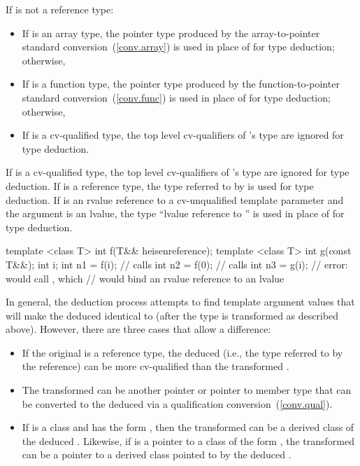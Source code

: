 \exitexample

\pnum
If
is not a reference type:

\begin{itemize}
\item
If
is an array type, the pointer type produced by the array-to-pointer
standard conversion~(\ref{conv.array}) is used in place of
for type deduction;
otherwise,
\item
If
is a function type, the pointer type produced by the
function-to-pointer standard conversion~(\ref{conv.func}) is used in place
of
for type
deduction; otherwise,
\item
If
is a cv-qualified type, the top level cv-qualifiers of
's
type are ignored for type deduction.
\end{itemize}

\pnum
If
is a cv-qualified type, the top level cv-qualifiers of
's
type are ignored for type deduction.
If
is a reference type, the type
referred to by
is used for type deduction.
If  is an rvalue reference to a cv-unqualified template parameter and the argument is an
lvalue, the type ``lvalue reference to '' is used in place of  for type
deduction. \enterexample
\begin{codeblock}
template <class T> int f(T&& heisenreference);
template <class T> int g(const T&&);
int i;
int n1 = f(i);                  // calls 
int n2 = f(0);                  // calls 
int n3 = g(i);                  // error: would call , which
                                // would bind an rvalue reference to an lvalue
\end{codeblock}
\exitexample

\pnum
In general, the deduction process attempts to find template argument
values that will make the deduced
identical to
(after
the type
is transformed as described above).
However, there are
three cases that allow a difference:

\begin{itemize}
\item
If the original
is a reference type, the deduced
(i.e.,
the type referred to by the reference) can be more cv-qualified than
the transformed .
\item
The transformed 
can be another pointer or pointer to member type that can be converted
to the deduced
via a qualification conversion~(\ref{conv.qual}).

\item
If
is a class and
has the form
,
then
the transformed 
can be a derived class of the
deduced
.
Likewise, if
is a pointer to a class of the form
,
the transformed 
can be a pointer to a
derived class pointed to by the deduced
.
\end{itemize}

